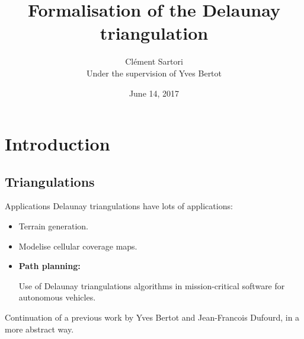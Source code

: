 \documentclass[18pt]{beamer}
\begin{document}
\title{Formalisation of the Delaunay triangulation}
\author[Clément Sartori]{Clément Sartori\\ Under the supervision of Yves Bertot}
\date{June 14, 2017}
\begin{frame}
 \maketitle
 \end{frame}


\section{Introduction}

\subsection{Triangulations}
\begin{frame}{Applications}
 Delaunay triangulations have lots of applications:
 \begin{itemize}
  \item<1,2,3,4> Terrain generation.
  \item<2,3,4> Modelise cellular coverage maps.
  \item<3,4> {\bf Path planning:}
  
  Use of Delaunay triangulations algorithms in mission-critical software for autonomous vehicles.
 \end{itemize}
 
Continuation of a previous work by Yves Bertot and Jean-Francois Dufourd, in a more abstract way.

\end{frame}
\end{document}

